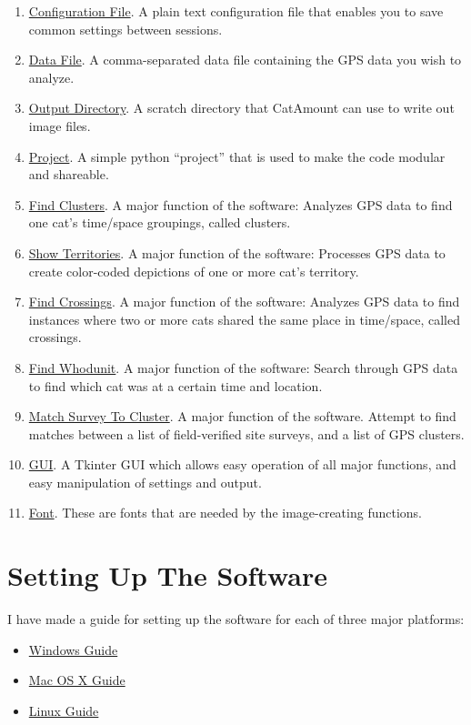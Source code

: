 \begin{enumerate}

\item \hyperlink{configuration-file}{Configuration File}. A plain text
  configuration file that enables you to save common settings between
  sessions.

\item \hyperlink{data-file}{Data File}. A comma-separated data file
  containing the GPS data you wish to analyze.

\item \hyperlink{output-directory}{Output Directory}. A scratch
  directory that CatAmount can use to write out image files.

\item \hyperlink{project}{Project}. A simple python ``project'' that
  is used to make the code modular and shareable.

\item \hyperlink{find-clusters}{Find Clusters}. A major function of
  the software: Analyzes GPS data to find one cat's time/space
  groupings, called clusters.

\item \hyperlink{show-territories}{Show Territories}. A major function
  of the software: Processes GPS data to create color-coded depictions
  of one or more cat's territory.

\item \hyperlink{find-crossings}{Find Crossings}. A major function of
  the software: Analyzes GPS data to find instances where two or more
  cats shared the same place in time/space, called crossings.

\item \hyperlink{find-whodunit}{Find Whodunit}. A major function of
  the software: Search through GPS data to find which cat was at a
  certain time and location.

\item \hyperlink{match-survey-to-cluster}{Match Survey To Cluster}. A
  major function of the software. Attempt to find matches between a
  list of field-verified site surveys, and a list of GPS clusters.

\item \hyperlink{gui}{GUI}. A Tkinter GUI which allows easy operation
  of all major functions, and easy manipulation of settings and
  output.

\item \hyperlink{font}{Font}. These are fonts that are needed by the
  image-creating functions.

\end{enumerate}


\section{Setting Up The Software}

I have made a guide for setting up the software for each of three
major platforms:

\begin{itemize}

\item \hyperlink{windows-overview}{Windows Guide}

\item \hyperlink{macosx-overview}{Mac OS X Guide}

\item \hyperlink{linux-overview}{Linux Guide}

\end{itemize}
